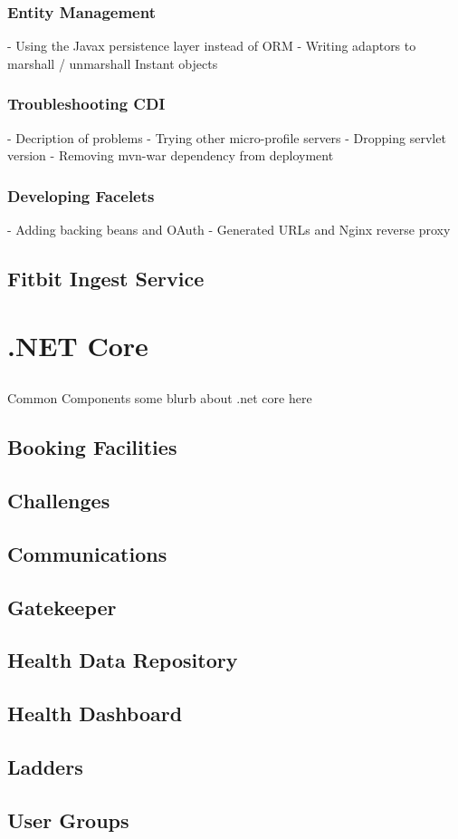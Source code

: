         \subsubsection{Entity Management}
        - Using the Javax persistence layer instead of ORM
        - Writing adaptors to marshall / unmarshall Instant objects

        \subsubsection{Troubleshooting CDI}
        - Decription of problems
        - Trying other micro-profile servers
        - Dropping servlet version
        - Removing mvn-war dependency from deployment

        \subsubsection{Developing Facelets}
        - Adding backing beans and OAuth
        - Generated URLs and Nginx reverse proxy

    \subsection{Fitbit Ingest Service}

\section{.NET Core}
    \subsection{}{Common Components}
some blurb about .net core here

    \subsection{Booking Facilities}

    \subsection{Challenges}

    \subsection{Communications}

    \subsection{Gatekeeper}

    \subsection{Health Data Repository}

    \subsection{Health Dashboard}

    \subsection{Ladders}

    \subsection{User Groups}
